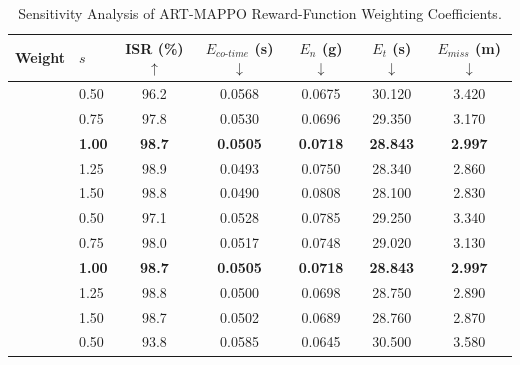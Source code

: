 \documentclass[lettersize,journal]{IEEEtran}
\begin{document}
\begin{table}[!t]
\centering
\scriptsize
\setlength{\tabcolsep}{3.5pt}
\renewcommand{\arraystretch}{1.15}
\caption{Sensitivity Analysis of ART-MAPPO Reward-Function Weighting
Coefficients.}
\label{tab:sensitivity_reward}
{
\begin{tabular}{@{}llccccc@{}}
\hline\hline
Weight & $s$ & ISR (\%) $\uparrow$ & $E_{co\text{-}time}$ (s) $\downarrow$
 & $E_n$ (g) $\downarrow$ & $E_t$ (s) $\downarrow$ & $E_{miss}$ (m) $\downarrow$ \\
\midrule
{}
 & 0.50          & 96.2          & 0.0568          & 0.0675          & 30.120          & 3.420 \\
 & 0.75          & 97.8          & 0.0530          & 0.0696          & 29.350          & 3.170 \\
 & \textbf{1.00} & \textbf{98.7} & \textbf{0.0505} & \textbf{0.0718} & \textbf{28.843} & \textbf{2.997} \\
 & 1.25          & 98.9          & 0.0493          & 0.0750          & 28.340          & 2.860 \\
 & 1.50          & 98.8          & 0.0490          & 0.0808          & 28.100          & 2.830 \\
\midrule
{}
 & 0.50          & 97.1          & 0.0528          & 0.0785          & 29.250          & 3.340 \\
 & 0.75          & 98.0          & 0.0517          & 0.0748          & 29.020          & 3.130 \\
 & \textbf{1.00} & \textbf{98.7} & \textbf{0.0505} & \textbf{0.0718} & \textbf{28.843} & \textbf{2.997} \\
 & 1.25          & 98.8          & 0.0500          & 0.0698          & 28.750          & 2.890 \\
 & 1.50          & 98.7          & 0.0502          & 0.0689          & 28.760          & 2.870 \\
\midrule
{}
 & 0.50          & 93.8          & 0.0585          & 0.0645          & 30.500          & 3.580 \\

\end{tabular}}
\end{table}
\end{document}
